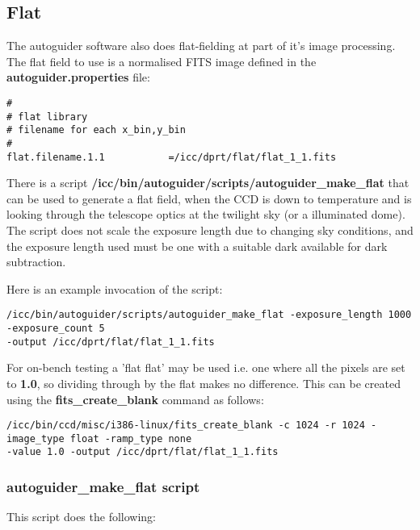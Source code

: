 \documentclass[10pt,a4paper]{article}
\begin{document}
\subsection{Flat}

The autoguider software also does flat-fielding at part of it's image processing. The flat field to use is a normalised
FITS image defined in the {\bf autoguider.properties} file:

\begin{verbatim}
#
# flat library
# filename for each x_bin,y_bin
#
flat.filename.1.1			=/icc/dprt/flat/flat_1_1.fits
\end{verbatim}

There is a script {\bf /icc/bin/autoguider/scripts/autoguider\_make\_flat} that can be used to generate a flat field, when the CCD is down to temperature and is looking through the telescope optics at the twilight sky (or a illuminated dome). The script does not scale the exposure length due to changing sky conditions, and the exposure length used must be
one with a suitable dark available for dark subtraction.

Here is an example invocation of the script:
\begin{verbatim}
/icc/bin/autoguider/scripts/autoguider_make_flat -exposure_length 1000 -exposure_count 5 
-output /icc/dprt/flat/flat_1_1.fits
\end{verbatim}

For on-bench testing a 'flat flat' may be used i.e. one where all the pixels are set to {\bf 1.0}, so dividing through by the flat makes no difference. This can be created using the {\bf fits\_create\_blank} command as follows:
\begin{verbatim}
/icc/bin/ccd/misc/i386-linux/fits_create_blank -c 1024 -r 1024 -image_type float -ramp_type none 
-value 1.0 -output /icc/dprt/flat/flat_1_1.fits
\end{verbatim}

\subsubsection{autoguider\_make\_flat script}

This script does the following:
\end{document}
